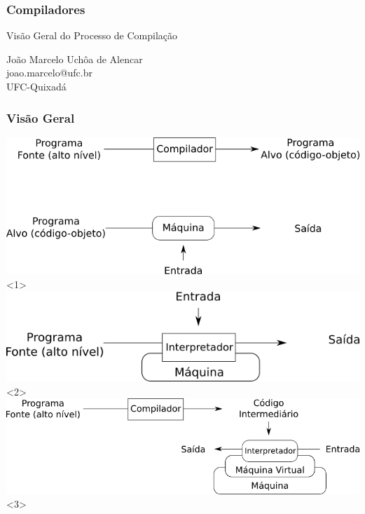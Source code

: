 \documentclass[table]{beamer}
\begin{document}
\begin{frame}
   \frametitle{Compiladores}
   \large
   \begin{center}
      Visão Geral do Processo de Compilação 
   \end{center}
   \scriptsize
   \begin{center}
      João Marcelo Uchôa de Alencar \\
      joao.marcelo@ufc.br \\
      UFC-Quixadá
   \end{center}
\end{frame}

\begin{frame}
   \tableofcontents
\end{frame}

\begin{frame}
   \frametitle{Visão Geral}
   \centering
   \includegraphics[width=\linewidth,height=\textheight,keepaspectratio]{figuras/visaogeralcompilacao.png}<1>
   \includegraphics[width=\linewidth,height=\textheight,keepaspectratio]{figuras/visaogeralinterpretacao.png}<2>
   \includegraphics[width=\linewidth,height=\textheight,keepaspectratio]{figuras/visaogeralvm.png}<3>
\end{frame}
\end{document}
